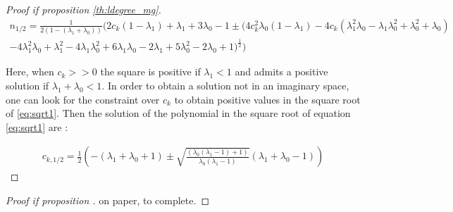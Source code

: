 \begin{proof}[Proof if proposition \ref{th:ldegree_mg}]
\begin{multline} \label{eq:sqrt1}
    n_{1/2} =  \frac{1}{2 \left(1 -(\lambda_1 + \lambda_0)\right)} \biggl(2 c_k (1-\lambda_1
    ) + \lambda_1 + 3 \lambda_0 -1 \pm 
    \biggl( 4 c_k^{2}\lambda_0(1 -  \lambda_1) 
    - 4 c_k  (\lambda_1^{2} \lambda_0 - \lambda_1 \lambda_0^{2} + \lambda_0^{2} + \lambda_0 ) \\
    - 4 \lambda_1^{2} \lambda_0 + \lambda_1^{2} - 4 \lambda_1 \lambda_0^{2} + 6 \lambda_1
    \lambda_0 - 2 \lambda_1 + 5 \lambda_0^{2} - 2 \lambda_0 + 1\biggr)^{\frac{1}{2}}\biggr) 
\end{multline}

Here, when $c_k >> 0$ the square is positive if $\lambda_1 < 1$ and admits a positive solution if $\lambda_1 + \lambda_0 < 1$. In order to obtain a solution not in an imaginary space, one can look for the constraint over
$c_k$ to obtain positive values in the square root of \eqref{eq:sqrt1}. Then the solution of the polynomial in the square root of equation \eqref{eq:sqrt1} are : 

\begin{align}
    c_{k,1/2} = \frac{1}{2} \left(-  \left(\lambda_1
    + \lambda_0 + 1\right) \pm \sqrt{\frac{\left(\lambda_0(\lambda_1 - 1) + 1\right)}{\lambda_0 \left(\lambda_1 - 1\right)}} \left(\lambda_1 + \lambda_0 - 1\right)\right) 
\end{align}

\end{proof}


\begin{proof}[Proof if proposition \label{th:feature_mg}]
on paper, to complete.
\end{proof}

